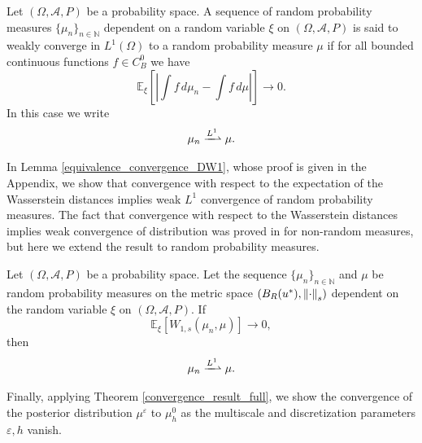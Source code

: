 \documentclass[10pt]{article}
\begin{document}
\begin{definition}
\label{weak_convergence_L1_distribution}
Let $(\Omega, \mathcal{A}, P)$ be a probability space. A sequence of random probability measures $\{ \mu_n \}_{n \in \mathbb{N}}$ dependent on a random variable $\xi$ on $(\Omega, \mathcal{A}, P)$ is said to weakly converge in $L^1(\Omega)$ to a random probability measure $\mu$ if for all bounded continuous functions $f \in C^0_B$ we have
\[ \mathbb{E}_{\xi} \left [ \left |\int f \, d \mu_n - \int f \, d \mu  \right | \right ] \to 0. \]
In this case we write
\[ \mu_n \xrightharpoonup{L^1} \mu. \]
\end{definition}

In Lemma \ref{equivalence_convergence_DW1}, whose proof is given in the Appendix, we show that convergence with respect to the expectation of the Wasserstein distances implies weak $L^1$ convergence of random probability measures. The fact that convergence with respect to the Wasserstein distances implies weak convergence of distribution was proved in \cite{San15} for non-random measures, but here we extend the result to random probability measures.

\begin{lemma}
\label{equivalence_convergence_DW1}
Let $(\Omega, \mathcal{A}, P)$ be a probability space. Let the sequence $\{ \mu_n \}_{n \in \mathbb{N}}$ and $\mu$ be random probability measures on the metric space $(B_R(u^*), \left\|\cdot\right\|_s)$ dependent on the random variable $\xi$ on $(\Omega, \mathcal{A}, P)$. If
\[ \mathbb{E}_{\xi} [W_{1,s}(\mu_n, \mu)] \to 0, \]
then
\[ \mu_n \xrightharpoonup{L^1} \mu. \]
\end{lemma}

Finally, applying Theorem \ref{convergence_result_full}, we show the convergence of the posterior distribution $\mu^{\varepsilon}$ to $\mu_h^0$ as the multiscale and discretization parameters $\varepsilon, h$ vanish.
\end{document}
